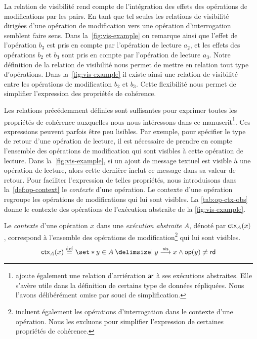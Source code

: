 La relation de visibilité rend compte de l'intégration des effets des opérations de modifications par les pairs.
En tant que tel seules les relations de visibilité dirigées d'une opération de modification vers une opération d'interrogation semblent faire sens.
Dans la~\autoref{fig:vis-example} on remarque ainsi que l'effet de l'opération $b_3$ est pris en compte par l'opération de lecture $a_2$, et les effets des opérations $b_2$ et $b_3$ sont pris en compte par l'opération de lecture $a_3$.
Notre définition de la relation de visibilité nous permet de mettre en relation tout type d'opérations.
Dans la~\autoref{fig:vis-example} il existe ainsi une relation de visibilité entre les opérations de modification $b_2$ et $b_3$.
Cette flexibilité nous permet de simplifier l'expression des propriétés de cohérence.

Les relations précédemment définies sont suffisantes pour exprimer toutes les propriétés de cohérence auxquelles nous nous intéressons dans ce manuscrit\footnote{\textcite{burckhardt_eventualconsistency_2014} ajoute également une relation d'arriération $\operatorname{\mathsf{ar}}$ à ses exécutions abstraites. Elle s'avère utile dans la définition de certains type de données répliquées. Nous l'avons délibérément omise par souci de simplification.}.
Ces expressions peuvent parfois être peu lisibles.
Par exemple, pour spécifier le type de retour d'une opération de lecture, il est nécessaire de prendre en compte l'ensemble des opérations de modification qui sont visibles à cette opération de lecture.
Dans la~\autoref{fig:vis-example}, si un ajout de message textuel est visible à une opération de lecture, alors cette dernière inclut ce message dans sa valeur de retour.
Pour faciliter l'expression de telles propriétés, nous introduisons dans la~\autoref{def:op-context} le \emph{contexte} d'une opération.
Le contexte d'une opération regroupe les opérations de modifications qui lui sont visibles.
La \autoref{tab:op-ctx-obs} donne le contexte des opérations de l'exécution abstraite de la \autoref{fig:vis-example}.

\begin{definition}[Contexte]\label{def:op-context}
Le \emph{contexte} d'une opération $x$ dans une \emph{exécution abstraite} $A$, dénoté par $\operatorname{\mathsf{ctx}}_A(x)$, correspond à l'ensemble des opérations de modification\footnote{\textcite{burckhardt_eventualconsistency_2014,viotti_consistency_2016} incluent également les opérations d'interrogation dans le contexte d'une opération. Nous les excluons pour simplifier l'expression de certaines propriétés de cohérence.} qui lui sont visibles.
\begin{equation*}
    \trm{ctx}_A(x) \defeq \set*{y \in A \given y \vis x \land \trm{op}(y) \neq \trm{rd}}
\end{equation*}
\end{definition}

